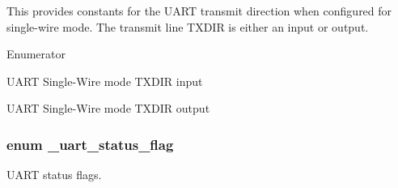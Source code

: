 This provides constants for the U\+A\+RT transmit direction when configured for single-\/wire mode. The transmit line T\+X\+D\+IR is either an input or output. \begin{Desc}
\item[Enumerator]\par
\begin{description}
\item[{\em 
k\+Uart\+Singlewire\+Txdir\+In\hypertarget{group__uart__hal_gga18cefb04a659432f96e2166b2205765aa204dcc6ef033e1c99037078bada5621c}{}\label{group__uart__hal_gga18cefb04a659432f96e2166b2205765aa204dcc6ef033e1c99037078bada5621c}
}]U\+A\+RT Single-\/\+Wire mode T\+X\+D\+IR input \item[{\em 
k\+Uart\+Singlewire\+Txdir\+Out\hypertarget{group__uart__hal_gga18cefb04a659432f96e2166b2205765aa1687332c34852bebdd0f36334a2b2bb3}{}\label{group__uart__hal_gga18cefb04a659432f96e2166b2205765aa1687332c34852bebdd0f36334a2b2bb3}
}]U\+A\+RT Single-\/\+Wire mode T\+X\+D\+IR output \end{description}
\end{Desc}
\subsubsection[{\texorpdfstring{\+\_\+uart\+\_\+status\+\_\+flag}{_uart_status_flag}}]{\setlength{\rightskip}{0pt plus 5cm}enum {\bf \+\_\+uart\+\_\+status\+\_\+flag}}\hypertarget{group__uart__hal_gaa4ec9f908b1b8e958c99ddff14373882}{}\label{group__uart__hal_gaa4ec9f908b1b8e958c99ddff14373882}


U\+A\+RT status flags. 

